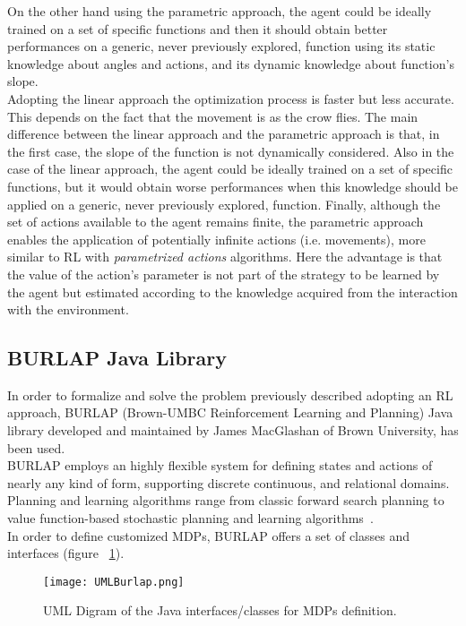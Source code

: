 On the other hand using the parametric approach, the agent could be ideally trained on a set of specific functions and then it should obtain better performances on a generic, never previously explored, function using its static knowledge about angles and actions, and its dynamic knowledge about function's slope. \\

Adopting the linear approach the optimization process is faster but less accurate. This depends on the fact that the movement is as the crow flies. The main difference between the linear approach and the parametric approach is that, in the first case, the slope of the function is not dynamically considered. Also in the case of the linear approach, the agent could be ideally trained on a set of specific functions, but it would obtain worse performances when this knowledge should be applied on a generic, never previously explored, function. Finally, although the set of actions available to the agent remains finite, the parametric approach enables the application of potentially infinite actions (i.e. movements), more similar to RL with \textit{parametrized actions} algorithms. Here the advantage is that the value of the action's parameter is not part of the strategy to be learned by the agent but estimated according to the knowledge acquired from the interaction with the environment.

\subsection{BURLAP Java Library}

In order to formalize and solve the problem previously described adopting an RL approach, BURLAP (Brown-UMBC Reinforcement Learning and Planning) Java library developed and maintained by James MacGlashan of Brown University, has been used. \\

BURLAP employs an highly flexible system for defining states and actions of nearly any kind of form, supporting discrete continuous, and relational domains. Planning and learning algorithms range from classic forward search planning to value function-based stochastic planning and learning algorithms~\cite{BURLAPSite}. \\

In order to define customized MDPs, BURLAP offers a set of classes and interfaces (figure ~\ref{fig:UMLBurlap}).

\begin{figure} [h!]
	\texttt{[image: UMLBurlap.png]}
	\caption{UML Digram of the Java interfaces/classes for MDPs definition.}
	\label{fig:UMLBurlap}
\end{figure}

